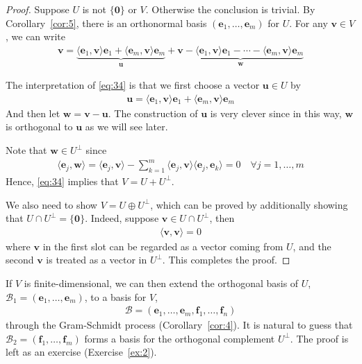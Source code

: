 \documentclass[thmcnt=section, color=blue, 12pt]{my-elegantbook}
\begin{document}
\begin{proof}
	Suppose $U$ is not $\{\mathbf{0}\}$ or $V$.
	Otherwise the conclusion is trivial.
	By Corollary~\ref{cor:5},
	there is an orthonormal basis $(\mathbf{e}_1, \ldots, \mathbf{e}_m)$
	for $U$.
	For any $\mathbf{v} \in V$, we can write 
	\begin{align}
		\mathbf{v} = \underbrace{
			\langle \mathbf{e}_1, \mathbf{v} \rangle \mathbf{e}_1 
			+ \langle \mathbf{e}_m, \mathbf{v} \rangle \mathbf{e}_m
		}_{\mathbf{u}} + \underbrace{\mathbf{v} 
		- \langle \mathbf{e}_1, \mathbf{v} \rangle \mathbf{e}_1 
		- \cdots 
		- \langle \mathbf{e}_m, \mathbf{v} \rangle \mathbf{e}_m}_{\mathbf{w}}
		\label{eq:34}
	\end{align}
	\begin{note}
		The interpretation of \eqref{eq:34} is that 
		we first choose a vector $\mathbf{u} \in U$ by
		\begin{align*}
			\mathbf{u} = \langle \mathbf{e}_1, \mathbf{v} \rangle \mathbf{e}_1 
			+ \langle \mathbf{e}_m, \mathbf{v} \rangle \mathbf{e}_m
		\end{align*}
		And then let $\mathbf{w} = \mathbf{v} - \mathbf{u}$.
		The construction of $\mathbf{u}$ is very clever
		since in this way, $\mathbf{w}$ is orthogonal to $\mathbf{u}$
		as we will see later.
	\end{note}
	\noindent Note that $\mathbf{w} \in U^\perp$
	since 
	\begin{align*}
		\langle \mathbf{e}_j, \mathbf{w} \rangle
		= \langle \mathbf{e}_j, \mathbf{v} \rangle
		- \sum_{k=1}^m \langle \mathbf{e}_j, \mathbf{v} \rangle \langle \mathbf{e}_j, \mathbf{e}_k \rangle
		= 0
		\quad 
		\forall j = 1, \ldots, m
	\end{align*}
	Hence, \eqref{eq:34} implies that $V = U + U^\perp$.

	We also need to show $V = U \oplus U^\perp$,
	which can be proved by additionally showing 
	that $U \cap U^\perp = \{\mathbf{0}\}$.
	Indeed, suppose $\mathbf{v} \in U \cap U^\perp$, 
	then 
	\begin{align*}
		\langle \mathbf{v}, \mathbf{v} \rangle = 0
	\end{align*}
	where $\mathbf{v}$ in the first slot
	can be regarded as a vector coming from $U$,
	and the second $\mathbf{v}$
	is treated as a vector in $U^\perp$.
	This completes the proof.
\end{proof}

If $V$ is finite-dimensional, 
we can then extend the orthogonal basis 
of $U$, $\mathcal{B}_1=(\mathbf{e}_1, \ldots, \mathbf{e}_m)$,
to a basis for $V$,
\begin{align*}
		\mathcal{B} = (\mathbf{e}_1, \ldots, \mathbf{e}_m, \mathbf{f}_1, \ldots, \mathbf{f}_n)
\end{align*}
through the Gram-Schmidt process (Corollary~\ref{cor:4}).
It is natural to guess that $\mathcal{B}_2=(\mathbf{f}_1, \ldots, \mathbf{f}_m)$
forms a basis for the orthogonal complement $U^\perp$.
The proof is left as an exercise (Exercise~\ref{ex:2}).
\end{document}
